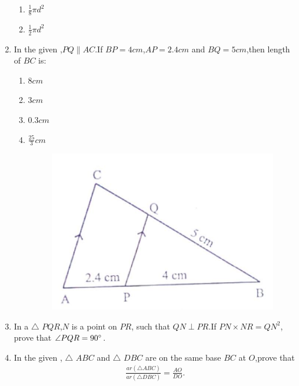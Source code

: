 \begin{enumerate}
\begin{enumerate}[label=(\alph*)]
        \item  $\frac{1}{8}\pi d^2$
        \item  $\frac{1}{2}\pi d^2$
    \end{enumerate}
    \item  In the given ,$PQ \parallel AC$.If $BP = 4 cm$,$AP = 2.4 cm$ and $BQ = 5 cm$,then length of $BC$ is:
    \begin{enumerate}[label=(\alph*)]
        \item $8 cm$
        \item $3 cm$
        \item $0.3 cm$
        \item $\frac{25}{3}cm$
          \begin{figure}[H]
  \centering
  \includegraphics[width=\columnwidth]{figs/right angle triangle.jpeg}
  \caption{}
  \label{fig:figures1}
\end{figure}
    \end{enumerate}
		\pagebreak
       \item  In a $\triangle$  $PQR$,$N$ is a point on $PR$, such that $QN \perp PR$.If $PN \times NR = QN^2$, prove that $\angle PQR = 90 \degree$.
    \item   In the given , $\triangle$ $ABC$ and  $\triangle$ $DBC$ are on the same base $BC$ at $O$,prove that
    \begin{align}
         \frac{ar (\triangle  ABC)}{ar (\triangle DBC)} = \frac{AO}{DO}.
    \end{align}
     \begin{figure}[H]
  \centering

\end{figure}
\end{enumerate}
